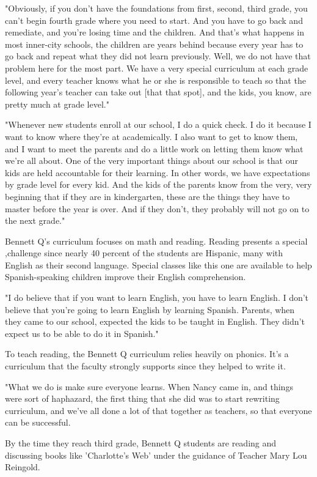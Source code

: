 "Obviously, if you don't have the foundations from first, second, third grade, you can't begin fourth grade where you need to start. And you have to go back and remediate, and you're losing time and the children. And that's what happens in most inner-city schools, the children are years behind because every year has to go back and repeat what they did not learn previously. Well, we do not have that problem here for the most part. We have a very special curriculum at each grade level, and every teacher knows what he or she is responsible to teach so that the following year's teacher can take out [that that spot], and the kids, you know, are pretty much at grade level."

"Whenever new students enroll at our school, I do a quick check. I do it because I want to know where they're at academically. I also want to get to know them, and I want to meet the parents and do a little work on letting them know what we're all about. One of the very important things about our school is that our kids are held accountable for their learning. In other words, we have expectations by grade level for every kid. And the kids of the parents know from the very, very beginning that if they are in kindergarten, these are the things they have to master before the year is over. And if they don't, they probably will not go on to the next grade."

Bennett Q's curriculum focuses on math and reading. Reading presents a special ,challenge since nearly 40 percent of the students are Hispanic, many with English as their second language. Special classes like this one are available to help Spanish-speaking children improve their English comprehension.

"I do believe that if you want to learn English, you have to learn English. I don't believe that you're going to learn English by learning Spanish. Parents, when they came to our school, expected the kids to be taught in English. They didn't expect us to be able to do it in Spanish."

To teach reading, the Bennett Q curriculum relies heavily on phonics. It's a curriculum that the faculty strongly supports since they helped to write it.

"What we do is make sure everyone learns. When Nancy came in, and things were sort of haphazard, the first thing that she did was to start rewriting curriculum, and we've all done a lot of that together as teachers, so that everyone can be successful.

By the time they reach third grade, Bennett Q students are reading and discussing books like 'Charlotte's Web' under the guidance of Teacher Mary Lou Reingold.

